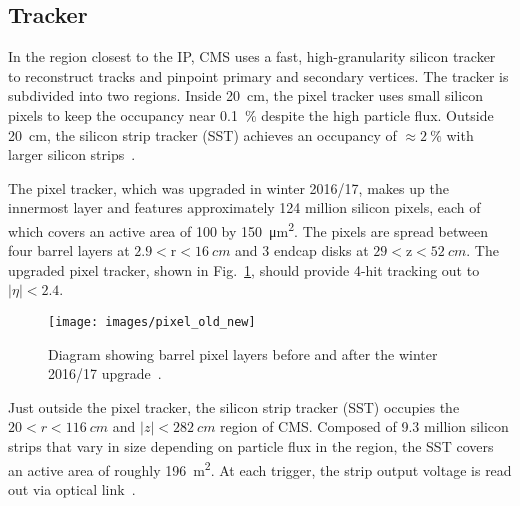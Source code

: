 \documentclass[12pt]{article}
\begin{document}
    \subsection{Tracker}
        In the region closest to the IP, CMS uses a fast, high-granularity silicon tracker to reconstruct tracks and pinpoint primary and secondary vertices. The tracker is subdivided into two regions. Inside \SI{20}{cm}, the pixel tracker uses small silicon pixels to keep the occupancy near \SI{0.1}{\percent} despite the high particle flux. Outside \SI{20}{\cm}, the silicon strip tracker (SST) achieves an occupancy of $\approx \SI{2}{\percent}$ with larger silicon strips~\cite{cms_tdr}.

        The pixel tracker, which was upgraded in winter 2016/17, makes up the innermost layer and features approximately \num{124} million silicon pixels, each of which covers an active area of \num{100} by \SI{150}{\micro\meter^2}. The pixels are spread between four barrel layers at $\num{2.9}<\mathrm{r}<\SI{16}{cm}$ and 3 endcap disks at $\num{29} < \mathrm{z} < \SI{52}{cm}$. The upgraded pixel tracker, shown in Fig.~\ref{pixel_old_new}, should provide 4-hit tracking out to $\lvert\eta\rvert < \num{2.4}$.

        \noindent \begin{figure}[htbp] \begin{center}
            \texttt{[image: images/pixel\_old\_new]}
            \caption{Diagram showing barrel pixel layers before and after the winter 2016/17 upgrade~\cite{pixel_old_new}.}
            \label{pixel_old_new}
        \end{center} \end{figure}
        
        Just outside the pixel tracker, the silicon strip tracker (SST) occupies the $\num{20} < r < \SI{116}{cm}$ and $\lvert z \rvert < \SI{282}{cm}$ region of CMS. Composed of \num{9.3} million silicon strips that vary in size depending on particle flux in the region, the SST covers an active area of roughly \SI{196}{m^2}. At each trigger, the strip output voltage is read out via optical link~\cite{cms_pixel_upgrade}.
\end{document}

